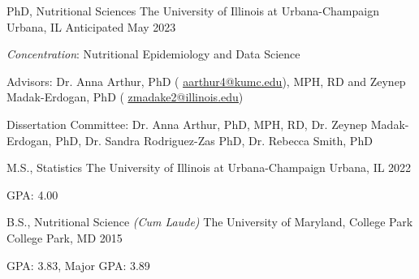 






\begin{cventries}

  \cventry
    {PhD, Nutritional Sciences} %
    {The University of Illinois at Urbana-Champaign} %
    {Urbana, IL} %
    {Anticipated May 2023} %
    {
      \begin{cvitems} %
        \item {\textit{Concentration}: Nutritional Epidemiology and Data Science}
         \item {Advisors: Dr. Anna Arthur, PhD ( \textcolor{navyblue}{{\underline{\href{mailto:aarthur4@kumc.edu}{aarthur4@kumc.edu}}}}), MPH, RD and Zeynep Madak-Erdogan, PhD ( \textcolor{navyblue}{\underline{\href{mailto:zmadake2@illinois.edu}{zmadake2@illinois.edu}}})}
         \item{Dissertation Committee: Dr. Anna Arthur, PhD, MPH, RD, Dr. Zeynep Madak-Erdogan, PhD, Dr. Sandra Rodriguez-Zas PhD, Dr. Rebecca Smith, PhD}
      \end{cvitems}
    }


  \cventry
    {M.S., Statistics} %
    {The University of Illinois at Urbana-Champaign} %
    {Urbana, IL} %
    {2022} %
    {
      \begin{cvitems} %
        \item {GPA: 4.00}
      \end{cvitems}
    }


  \cventry
    {B.S., Nutritional Science \textit{(Cum Laude)}} %
    {The University of Maryland, College Park} %
    {College Park, MD} %
    {2015} %
    {
      \begin{cvitems} %
        \item {GPA: 3.83, Major GPA: 3.89}
      \end{cvitems}
    }

\end{cventries}
